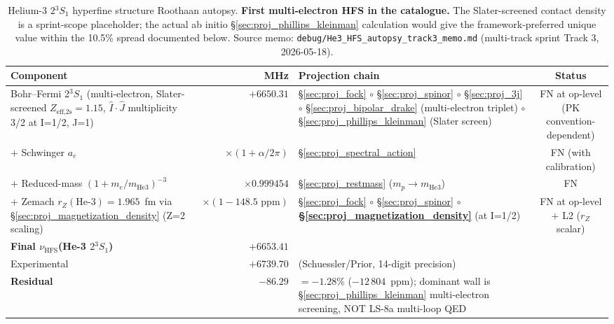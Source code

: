 \documentclass[11pt]{article}
\begin{document}
\begin{table}[h]
\centering\small
\begin{tabular}{p{4.5cm} r p{6cm} c}
\toprule
Component & MHz & Projection chain & Status \\
\midrule
Bohr--Fermi 2$^3\!S_1$ (multi-electron, Slater-screened
$Z_\text{eff,2s}=1.15$, $\hat{I}\!\cdot\!\hat{J}$ multiplicity 3/2
at I=1/2, J=1) & $+6650.31$ &
\S\ref{sec:proj_fock} $\circ$ \S\ref{sec:proj_spinor} $\circ$
\S\ref{sec:proj_3j} $\circ$ \S\ref{sec:proj_bipolar_drake}
(multi-electron triplet) $\circ$
\S\ref{sec:proj_phillips_kleinman} (Slater screen) & FN at op-level
(PK convention-dependent) \\
$+$ Schwinger $a_e$ & $\times(1+\alpha/2\pi)$ &
\S\ref{sec:proj_spectral_action} & FN (with calibration) \\
$+$ Reduced-mass $(1+m_e/m_\text{He3})^{-3}$ & $\times 0.999454$ &
\S\ref{sec:proj_restmass} ($m_p \to m_\text{He3}$) & FN \\
$+$ Zemach $r_Z(\text{He-3})=1.965$~fm via
\S\ref{sec:proj_magnetization_density} (Z=2 scaling) &
$\times (1-148.5\text{~ppm})$ &
\S\ref{sec:proj_fock} $\circ$ \S\ref{sec:proj_spinor} $\circ$
\textbf{\S\ref{sec:proj_magnetization_density}} (at I=1/2) &
FN at op-level $+$ L2 ($r_Z$ scalar) \\
\midrule
\textbf{Final $\nu_\text{HFS}$(He-3 $2{}^3\!S_1$)} & $+6653.41$ & & \\
Experimental & $+6739.70$ & (Schuessler/Prior, 14-digit precision) & \\
\textbf{Residual} & $-86.29$ & $= -1.28\%$ ($-12\,804$~ppm); dominant
wall is \S\ref{sec:proj_phillips_kleinman} multi-electron screening,
NOT LS-8a multi-loop QED & \\
\bottomrule
\end{tabular}
\caption{Helium-3 $2{}^3\!S_1$ hyperfine structure Roothaan autopsy.
\textbf{First multi-electron HFS in the catalogue.} The Slater-screened
contact density is a sprint-scope placeholder; the actual ab initio
\S\ref{sec:proj_phillips_kleinman} calculation would give the
framework-preferred unique value within the 10.5\% spread documented
below. Source memo: \texttt{debug/He3\_HFS\_autopsy\_track3\_memo.md}
(multi-track sprint Track 3, 2026-05-18).}
\label{tab:autopsy_he3_hfs}
\end{table}
\end{document}
